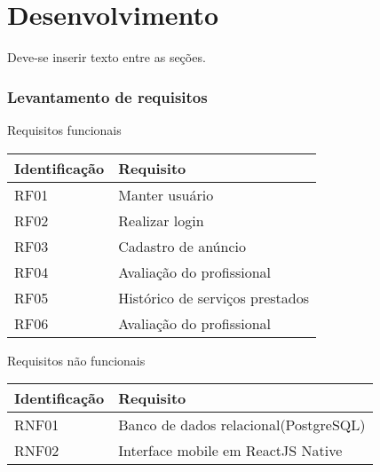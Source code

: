 \chapter{Desenvolvimento}\label{cap:desenvolvimento}
Deve-se inserir texto entre as seções.
\subsection{Levantamento de requisitos}
\begin{quadro}[htb]
	\centering
	\caption{\label{Formatação do texto.}Requisitos funcionais}	
	\begin{tabular}{|l|p{11cm}|}
		\hline
		\textbf{Identificação}    & \textbf{Requisito}\\ \hline
		RF01        			  & Manter usuário\\ \hline
		RF02        			  & Realizar login\\ \hline
		RF03         			  & Cadastro de anúncio\\ \hline
		RF04        			  & Avaliação do profissional\\ \hline
		RF05        			  & Histórico de serviços prestados\\ \hline
		RF06        			  & Avaliação do profissional\\ \hline
	\end{tabular}
\end{quadro}

\begin{quadro}[htb]
	\centering
	\caption{\label{Formatação do texto.}Requisitos não funcionais}	
	\begin{tabular}{|l|p{11cm}|}
		\hline
		\textbf{Identificação}    & \textbf{Requisito}\\ \hline
		RNF01        			  & Banco de dados relacional(PostgreSQL)\\ \hline
		RNF02        			  & Interface mobile em ReactJS Native\\ \hline
	\end{tabular}
\end{quadro}

